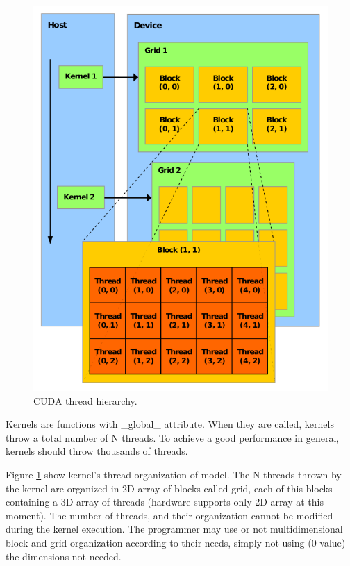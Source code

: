 \documentclass[thesis=M,english]{FITthesis}[2011/07/15]
\begin{document}
\begin{figure}[h]
\centering
\includegraphics[scale=0.4]{images/cuda_threads.png}
\caption{CUDA thread hierarchy.}
\label{fig:cuda_threads}
\end{figure}

Kernels are functions with \_global\_ attribute. When they are called, kernels throw a total number of N threads. To achieve a good performance in general, kernels should throw thousands of threads. 

Figure \ref{fig:cuda_threads} show kernel’s thread organization of model. The N threads thrown by the kernel are organized in 2D array of blocks called grid, each of this blocks containing a 3D array of threads (hardware supports only 2D array at this moment). The number of threads, and their organization cannot be modified during the kernel execution. The programmer may use or not multidimensional block and grid organization according to their needs, simply not using (0 value) the dimensions not needed. 
\end{document}

